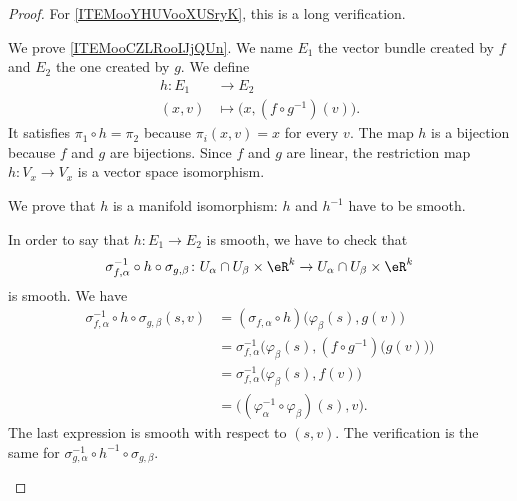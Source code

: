 \begin{proof}
	For \ref{ITEMooYHUVooXUSryK}, this is a long verification.

	We prove \ref{ITEMooCZLRooIJjQUn}. We name \( E_1\) the vector bundle created by \( f\) and \( E_2\) the one created by \( g\). We define
	\begin{equation}
		\begin{aligned}
			h\colon E_1 & \to E_2                                   \\
			(x,v)       & \mapsto \big( x,(f\circ g^{-1})(v) \big).
		\end{aligned}
	\end{equation}
	It satisfies \( \pi_1\circ h=\pi_2\) because \( \pi_i(x,v)=x\) for every \( v\). The map \( h\) is a bijection because \( f\) and \( g\) are bijections. Since \( f\) and \( g\) are linear, the restriction map \(h \colon V_x\to V_x  \) is a vector space isomorphism.

	We prove that \( h\) is a manifold isomorphism: \( h\) and \( h^{-1}\) have to be smooth.
	\begin{subproof}
		\spitem[\( h\) is smooth]
		In order to say that \(h \colon E_1\to E_2  \) is smooth, we have to check that
		\begin{equation}
			\sigma_{f,\alpha}^{-1}\circ h\circ \sigma_{g,\beta} \colon  U_{\alpha}\cap U_{\beta}\times \eR^k  \to U_{\alpha}\cap U_{\beta}\times \eR^k
		\end{equation}
		is smooth. We have
		\begin{subequations}
			\begin{align}
				\sigma_{f,\alpha}^{-1}\circ h\circ\sigma_{g,\beta}(s,v) & = (\sigma_{f,\alpha}\circ h)\big( \varphi_{\beta}(s),g(v) \big)                       \\
				                                                        & =\sigma_{f,\alpha}^{-1}\Big( \varphi_{\beta}(s),(f\circ g^{-1})\big( g(v) \big) \Big) \\
				                                                        & =\sigma_{f,\alpha}^{-1}\big( \varphi_{\beta}(s),f(v) \big)                            \\
				                                                        & = \big( (\varphi_{\alpha}^{-1}\circ \varphi_{\beta})(s),v \big).
			\end{align}
		\end{subequations}
		The last expression is smooth with respect to \( (s,v)\).
		\spitem[\( h^{-1}\) is smooth]
		The verification is the same for \( \sigma_{g,\alpha}^{-1}\circ h^{-1}\circ\sigma_{g,\beta}\).
	\end{subproof}
\end{proof}

